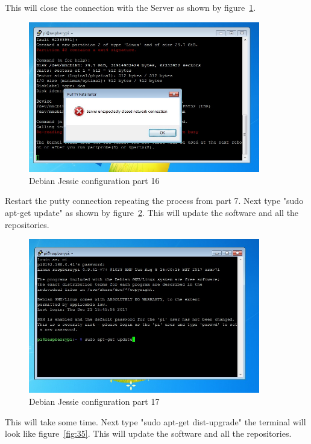 \documentclass[12pt,]{article}
\begin{document}
This will close the connection with the Server as shown by figure~\ref{fig:33}.
\begin{figure}[H]
  	\begin{center}
    	\includegraphics[width=0.9\textwidth]{Ras_15}
  	\end{center}
  	\caption{Debian Jessie configuration part 16}
	\label{fig:33}
\end{figure}
Restart the putty connection repeating the process from part 7. Next type "sudo apt-get update" as shown by figure~\ref{fig:34}. This will update the software and all the repositories.
\begin{figure}[H]
  	\begin{center}
    	\includegraphics[width=0.9\textwidth]{Ras_16}
  	\end{center}
  	\caption{Debian Jessie configuration part 17}
	\label{fig:34}
\end{figure}
This will take some time. Next type "sudo apt-get dist-upgrade" the terminal will look like figure~\ref{fig:35}. This will update the software and all the repositories.
\end{document}
